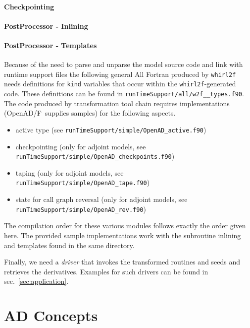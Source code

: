 \documentclass{book}
\newcommand{\OpenADF}{OpenAD/F}
\newcommand{\refsec}[1]{{sec.~\ref{#1}}}
\begin{document}
\subsubsection{Checkpointing}

\subsubsection{PostProcessor - Inlining}

\subsubsection{PostProcessor - Templates}

Because of the need to parse and unparse the model source code and link 
with runtime support files the following general 
All Fortran produced by \lstinline{whirl2f} needs definitions for \lstinline{kind} 
variables that occur within the \lstinline{whirl2f}-generated code. 
These definitions can be found in \lstinline{runTimeSupport/all/w2f__types.f90}.
The code produced by  transformation tool chain 
requires  implementations 
(\OpenADF\ supplies samples) for the following aspects.
\begin{itemize}
\item active type (see \lstinline{runTimeSupport/simple/OpenAD_active.f90})
\item checkpointing (only  for adjoint models, see \lstinline{runTimeSupport/simple/OpenAD_checkpoints.f90})  
\item taping (only  for adjoint models, see \lstinline{runTimeSupport/simple/OpenAD_tape.f90})  
\item state for call graph reversal (only  for adjoint models, see \lstinline{runTimeSupport/simple/OpenAD_rev.f90})
\end{itemize}
The compilation order for these various modules follows exactly the order given here.
The provided sample implementations work with the subroutine inlining and templates found in the same 
directory.

Finally, we need a {\em driver} that invokes the transformed routines and seeds and retrieves the derivatives.
Examples for such drivers can be found in \refsec{sec:application}.

\chapter{AD Concepts}\label{sec:ADIntro}
\end{document}
